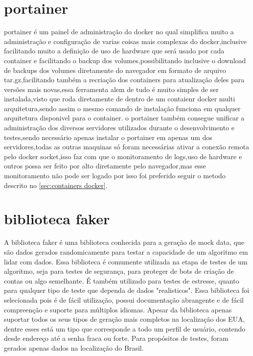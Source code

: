 \documentclass[
	12pt,				%
	openright,			%
	oneside,			%
	a4paper,			%
	english,			%
	french,				%
	spanish,			%
	brazil,				%
	]{abntex2}
\begin{document}
\section{portainer}
\label{sec:portainer}
portainer é um painel de administração do docker no qual simplifica muito a administração e configuração de varias coisas mais complexas do docker,inclusive facilitando muito a definição de uso de hardware que será usado por cada container e facilitando o backup dos volumes,possibilitando inclusive o download de backups dos volumes diretamente do navegador em formato de arquivo tar.gz,facilitando também a recriação dos containers para atualização deles para versões mais novas,essa ferramenta alem de tudo é muito simples de ser instalada,visto que roda diretamente de dentro de um contaienr docker multi arquitetura,sendo assim o mesmo comando de instalação funciona em qualquer arquitetura disponivel para o container.
o portainer também consegue unificar a administração dos diversos servidores utilizados durante o desenvolvimento e testes,sendo necessário apenas instalar o portainer em apenas um dos servidores,todas as outras maquinas só foram necessárias ativar a conexão remota pelo docker socket,isso faz com que o monitoramento de logs,uso de hardware e outros possa ser feito por alto diretamente pelo navegador,mas esse monitoramento não pode ser logado por isso foi preferido seguir o metodo descrito no \autoref{sec:containers docker}.

\section{biblioteca faker}
\label{sec:biblioteca faker}
A biblioteca faker é uma biblioteca conhecida para a geração de mock data, que são dados gerados randomicamente para testar a capacidade de um algoritmo em lidar com dados. Essa biblioteca é comumente utilizada na etapa de testes de um algoritmo, seja para testes de segurança, para proteger de bots de criação de contas ou algo semelhante. É também utilizado para testes de estresse, quanto para qualquer tipo de teste que dependa de dados "realisticos".\newline
Essa biblioteca foi selecionada pois é de fácil utilização, possui documentação abrangente e de fácil compreenção e suporte para múltiplos idiomas. Apesar da biblioteca apenas suportar todos os seus tipos de geração mais completos na localização dos EUA, dentre esses está um tipo que corresponde a todo um perfil de usuário, contendo desde endereço até a senha fraca ou forte. Para propósitos de testes, foram gerados apenas dados na localização do Brasil.\newline
\end{document}
